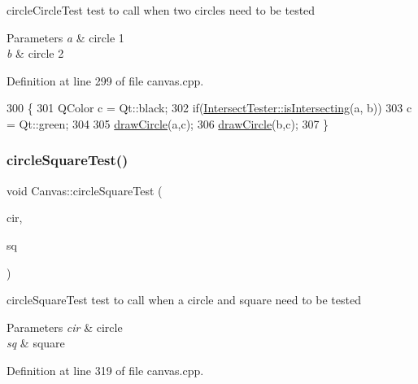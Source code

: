 circle\+Circle\+Test test to call when two circles need to be tested 


\begin{DoxyParams}{Parameters}
{\em a} & circle 1 \\
\hline
{\em b} & circle 2 \\
\hline
\end{DoxyParams}


Definition at line 299 of file canvas.\+cpp.


\begin{DoxyCode}
300 \{
301     QColor c = Qt::black;
302     \textcolor{keywordflow}{if}(\hyperlink{class_intersect_tester_a7710e17ff7d2e229059f23b9429213f5}{IntersectTester::isIntersecting}(a, b))
303         c = Qt::green;
304 
305     \hyperlink{class_canvas_ab1413076d90539aea7ac3a06b065afe2}{drawCircle}(a,c);
306     \hyperlink{class_canvas_ab1413076d90539aea7ac3a06b065afe2}{drawCircle}(b,c);
307 \}
\end{DoxyCode}
\mbox{\label{class_canvas_ad9d725683b22b2dc7a5974fed63c16bb}} 
\subsubsection{\texorpdfstring{circle\+Square\+Test()}{circleSquareTest()}}
{\footnotesize\ttfamily void Canvas\+::circle\+Square\+Test (\begin{DoxyParamCaption}\item[{\hyperlink{class_circle}{Circle}}]{cir,  }\item[{\hyperlink{class_a_a_b_b}{A\+A\+BB}}]{sq }\end{DoxyParamCaption})\hspace{0.3cm}{\ttfamily [private]}}



circle\+Square\+Test test to call when a circle and square need to be tested 


\begin{DoxyParams}{Parameters}
{\em cir} & circle \\
\hline
{\em sq} & square \\
\hline
\end{DoxyParams}


Definition at line 319 of file canvas.\+cpp.



